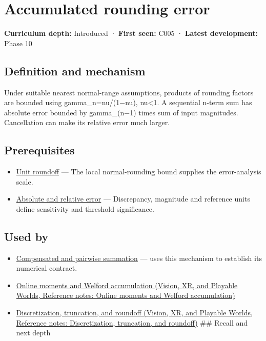 \hypertarget{appendix-f82e270791c8}{}\label{referencestart:appendix-f82e270791c8}
\section{Accumulated rounding error}\label{appendix-f82e270791c8-accumulated-rounding-error}

\textbf{Curriculum depth:} Introduced · \textbf{First seen:} C005 · \textbf{Latest development:} Phase 10

\begin{allmightroledefinition}

\subsection{Definition and mechanism}\label{appendix-f82e270791c8-definition-and-mechanism}

Under suitable nearest normal-range assumptions, products of rounding factors are bounded using gamma\_n=nu/(1−nu), nu\textless1. A sequential n-term sum has absolute error bounded by gamma\_(n−1) times sum of input magnitudes. Cancellation can make its relative error much larger.

\end{allmightroledefinition}

\subsection{Prerequisites}\label{appendix-f82e270791c8-prerequisites}

\begin{itemize}
\tightlist
\item
  \hyperref[appendix-bc44f7b42f42]{Unit roundoff} --- The local normal-rounding bound supplies the error-analysis scale.
\item
  \hyperref[appendix-3ae74e89b4e6]{Absolute and relative error} --- Discrepancy, magnitude and reference units define sensitivity and threshold significance.
\end{itemize}

\subsection{Used by}\label{appendix-f82e270791c8-used-by}

\begin{itemize}
\item
  \hyperref[appendix-df318da57389]{Compensated and pairwise summation} --- uses this mechanism to establish its numerical contract.
\item
  \href{../07-Vision-XR-and-Playable-Worlds/main.pdf\#nameddest=appendix-33237f0f618b}{Online moments and Welford accumulation (Vision, XR, and Playable Worlds, Reference notes: Online moments and Welford accumulation)}
\item
  \href{../07-Vision-XR-and-Playable-Worlds/main.pdf\#nameddest=appendix-6b0648b2b8e8}{Discretization, truncation, and roundoff (Vision, XR, and Playable Worlds, Reference notes: Discretization, truncation, and roundoff)} \#\# Recall and next depth
\end{itemize}


